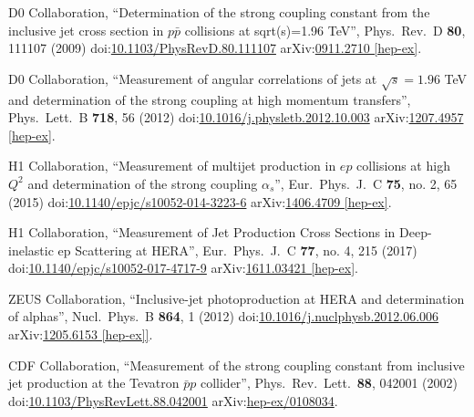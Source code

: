 \begin{thebibliography}{99}
D0 Collaboration, ``Determination of the strong coupling constant from the inclusive jet cross section in $p\bar{p}$ collisions at sqrt(s)=1.96 TeV'', Phys.\ Rev.\ D {\bf 80}, 111107 (2009) doi:\href{http://dx.doi.org/10.1103/PhysRevD.80.111107}{10.1103/PhysRevD.80.111107} arXiv:\href{https://arxiv.org/abs/0911.2710}{0911.2710 [hep-ex]}.

D0 Collaboration, ``Measurement of angular correlations of jets at $\sqrt{s}=1.96$ TeV and determination of the strong coupling at high momentum transfers'', Phys.\ Lett.\ B {\bf 718}, 56 (2012) doi:\href{http://dx.doi.org/10.1016/j.physletb.2012.10.003}{10.1016/j.physletb.2012.10.003} arXiv:\href{https://arxiv.org/abs/1207.4957}{1207.4957 [hep-ex]}.

H1 Collaboration, ``Measurement of multijet production in $ep$ collisions at high $Q^2$ and determination of the strong coupling $\alpha _s$'', Eur.\ Phys.\ J.\ C {\bf 75}, no. 2, 65 (2015) doi:\href{http://dx.doi.org/10.1140/epjc/s10052-014-3223-6}{10.1140/epjc/s10052-014-3223-6} arXiv:\href{https://arxiv.org/abs/1406.4709}{1406.4709 [hep-ex]}.

H1 Collaboration, ``Measurement of Jet Production Cross Sections in Deep-inelastic ep Scattering at HERA'', Eur.\ Phys.\ J.\ C {\bf 77}, no. 4, 215 (2017) doi:\href{http://dx.doi.org/10.1140/epjc/s10052-017-4717-9}{10.1140/epjc/s10052-017-4717-9} arXiv:\href{https://arxiv.org/abs/1611.03421}{1611.03421 [hep-ex]}.

ZEUS Collaboration, ``Inclusive-jet photoproduction at HERA and determination of alphas'', Nucl.\ Phys.\ B {\bf 864}, 1 (2012) doi:\href{http://dx.doi.org/10.1016/j.nuclphysb.2012.06.006}{10.1016/j.nuclphysb.2012.06.006} arXiv:\href{https://arxiv.org/abs/1205.6153}{1205.6153 [hep-ex]]}.

CDF Collaboration, ``Measurement of the strong coupling constant from inclusive jet production at the Tevatron $\bar{p}p$ collider'', Phys.\ Rev.\ Lett.\  {\bf 88}, 042001 (2002) doi:\href{http://dx.doi.org/10.1103/PhysRevLett.88.042001}{10.1103/PhysRevLett.88.042001} arXiv:\href{https://arxiv.org/pdf/hep-ex/0108034.pdf}{hep-ex/0108034}.


\end{thebibliography}
